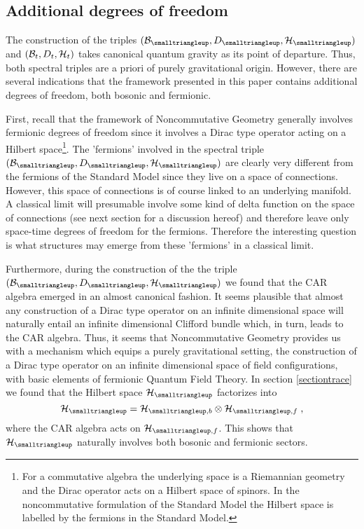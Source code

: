 \documentclass[12pt]{article}
\def\cb{{\cal B}}
\def\ch{{\cal H}}
\begin{document}
\subsection{Additional degrees of freedom}

The construction of the triples $(\cb_{\smalltriangleup},D_{\smalltriangleup},\ch_\smalltriangleup)$ and $(\cb_t,D_t,\ch_t)$ takes canonical quantum gravity as its point of departure. Thus, both spectral triples are a priori of purely gravitational origin. However, there are several indications that the framework presented in this paper contains additional degrees of freedom, both bosonic and fermionic.

First, recall that the framework of Noncommutative Geometry generally involves fermionic degrees of freedom since it involves a Dirac type operator acting on a Hilbert space\footnote{For a commutative algebra the underlying space is a Riemannian geometry and the Dirac operator acts on a Hilbert space of spinors. In the noncommutative formulation of the Standard Model the Hilbert space is labelled by the fermions in the Standard Model.}. The 'fermions' involved in the spectral triple $(\cb_{\smalltriangleup},D_{\smalltriangleup},\ch_\smalltriangleup)$ are clearly very different from the fermions of the Standard Model since they live on a space of connections. However, this space of connections is of course linked to an underlying manifold. A classical limit will presumable involve some kind of delta function on the space of connections (see next section for a discussion hereof) and therefore leave only space-time degrees of freedom for the fermions. Therefore the interesting question is what structures may emerge from these 'fermions' in a classical limit.

Furthermore, during the construction of the the triple $(\cb_{\smalltriangleup},D_{\smalltriangleup},\ch_\smalltriangleup)$ we found that the CAR algebra emerged in an almost canonical fashion. It seems plausible that almost any construction of a Dirac type operator on an infinite dimensional space will naturally entail an infinite dimensional Clifford bundle which, in turn, leads to the CAR algebra. Thus, it seems that Noncommutative Geometry provides us with a mechanism which equips a purely gravitational setting, the construction of a Dirac type operator on an infinite dimensional space of field configurations, with basic elements of fermionic Quantum Field Theory.
In section \ref{sectiontrace} we found that the Hilbert space $\ch_\smalltriangleup$ factorizes into
\[
\ch_\smalltriangleup = \ch_{\smalltriangleup,b}\otimes \ch_{\smalltriangleup,f}\;,
\]
where the CAR algebra acts on $\ch_{\smalltriangleup,f}$. This shows that $\ch_\smalltriangleup$ naturally involves both bosonic and fermionic sectors.
\end{document}
